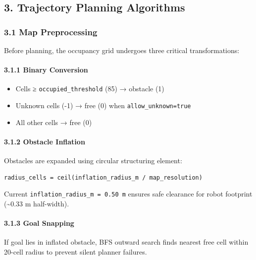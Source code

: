 \hypertarget{trajectory-planning-algorithms}{%
\subsection{3. Trajectory Planning
Algorithms}\label{trajectory-planning-algorithms}}

\hypertarget{map-preprocessing}{%
\subsubsection{3.1 Map Preprocessing}\label{map-preprocessing}}

Before planning, the occupancy grid undergoes three critical
transformations:

\hypertarget{binary-conversion}{%
\paragraph{3.1.1 Binary Conversion}\label{binary-conversion}}

\begin{itemize}
\tightlist
\item
  Cells ≥ \texttt{occupied\_threshold} (85) → obstacle (1)
\item
  Unknown cells (-1) → free (0) when \texttt{allow\_unknown=true}
\item
  All other cells → free (0)
\end{itemize}

\hypertarget{obstacle-inflation}{%
\paragraph{3.1.2 Obstacle Inflation}\label{obstacle-inflation}}

Obstacles are expanded using circular structuring element:

\begin{verbatim}
radius_cells = ceil(inflation_radius_m / map_resolution)
\end{verbatim}

Current \texttt{inflation\_radius\_m\ =\ 0.50\ m} ensures safe clearance
for robot footprint (\textasciitilde0.33 m half-width).

\hypertarget{goal-snapping}{%
\paragraph{3.1.3 Goal Snapping}\label{goal-snapping}}

If goal lies in inflated obstacle, BFS outward search finds nearest free
cell within 20-cell radius to prevent silent planner failures.

